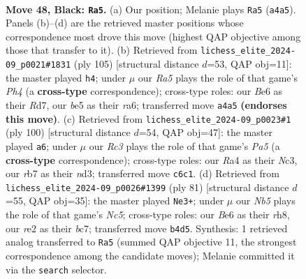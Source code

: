 \documentclass[11pt]{article}
\begin{document}
\clearpage

\begin{figure}[p]\centering
\begin{subfigure}{0.46\textwidth}\centering
\resizebox{\linewidth}{!}{%
\newchessgame
\chessboard[
  setfen={4k3/1R6/2r1b3/1p2B1p1/rn6/4P1PP/4RP1K/8 b - - 6 48},
  showmover=false,
  pgfstyle=straightmove, color=movearrow, markmove={a4-a5}
]}
\caption{}
\end{subfigure}\hfill
\begin{subfigure}{0.46\textwidth}\centering
\resizebox{\linewidth}{!}{%
\newchessgame
\chessboard[
  setfen={r7/P1pr1k2/R7/1PRn2pp/3B4/7P/5PPK/8 b - - 7 53},
  showmover=false,
  pgfstyle=straightmove, color=movearrow, markmove={h5-h4}
]}
\caption{}
\end{subfigure}
\\[4pt]
\begin{subfigure}{0.46\textwidth}\centering
\resizebox{\linewidth}{!}{%
\newchessgame
\chessboard[
  setfen={R7/1r5p/5p2/P3pkp1/8/2NnB3/1P5P/1K6 w - - 7 51},
  showmover=false,
  pgfstyle=straightmove, color=movearrow, markmove={a5-a6}
]}
\caption{}
\end{subfigure}\hfill
\begin{subfigure}{0.46\textwidth}\centering
\resizebox{\linewidth}{!}{%
\newchessgame
\chessboard[
  setfen={7R/2B2k2/8/3p2pp/2nP4/2P3P1/1r3PK1/8 b - - 1 41},
  showmover=false,
  pgfstyle=straightmove, color=movearrow, markmove={c4-e3}
]}
\caption{}
\end{subfigure}
\caption{\textbf{Move 48, Black: \texttt{Ra5}.} (a) Our position; Melanie plays \texttt{Ra5} (\texttt{a4a5}). Panels (b)--(d) are the retrieved master positions whose correspondence most drove this move (highest QAP objective among those that transfer to it). (b) Retrieved from \texttt{lichess\_elite\_2024-09\_p0021\#1831} (ply 105) [structural distance $d$=53, QAP obj=11]: the master played \texttt{h4}; under $\mu$ our \emph{Ra5} plays the role of that game's \emph{Ph4} (a \textbf{cross-type} correspondence); cross-type roles: our \emph{B}e6 as their \emph{R}d7, our \emph{b}e5 as their \emph{r}a6; transferred move \texttt{a4a5} \textbf{(endorses this move)}. (c) Retrieved from \texttt{lichess\_elite\_2024-09\_p0023\#1} (ply 100) [structural distance $d$=54, QAP obj=47]: the master played \texttt{a6}; under $\mu$ our \emph{Rc3} plays the role of that game's \emph{Pa5} (a \textbf{cross-type} correspondence); cross-type roles: our \emph{R}a4 as their \emph{N}c3, our \emph{r}b7 as their \emph{n}d3; transferred move \texttt{c6c1}. (d) Retrieved from \texttt{lichess\_elite\_2024-09\_p0026\#1399} (ply 81) [structural distance $d$=55, QAP obj=35]: the master played \texttt{Ne3+}; under $\mu$ our \emph{Nb5} plays the role of that game's \emph{Nc5}; cross-type roles: our \emph{B}e6 as their \emph{r}h8, our \emph{r}e2 as their \emph{b}c7; transferred move \texttt{b4d5}. Synthesis: 1 retrieved analog transferred to \texttt{Ra5} (summed QAP objective 11, the strongest correspondence among the candidate moves); Melanie committed it via the \texttt{search} selector.}
\label{fig:thought-m95}
\end{figure}
\end{document}
